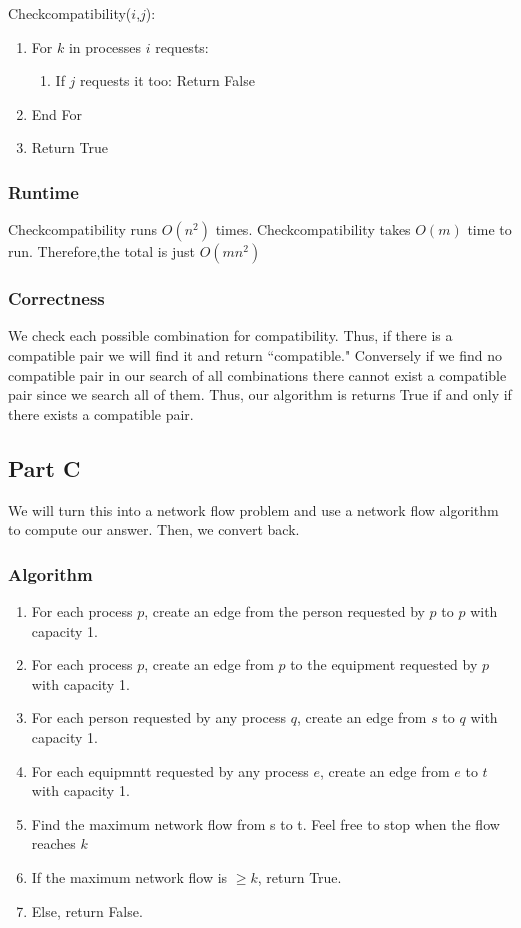 \documentclass{article}
\begin{document}
\begin{center}Checkcompatibility($i$,$j$):\end{center}
\begin{enumerate}
\item For $k$ in processes $i$ requests:
\begin{enumerate}
\item If $j$ requests it too: Return False
\end{enumerate}
\item End For
\item Return True
\end{enumerate}

\subsubsection{Runtime}
Checkcompatibility runs $O(n^2)$ times. Checkcompatibility takes $O(m)$ time to run. Therefore,the total is just $O(mn^2) $
\subsubsection{Correctness}
We check each possible combination for compatibility. Thus, if there is a compatible pair we will find it and return ``compatible." Conversely if we find no compatible pair in our search of all combinations there cannot exist a compatible pair since we search all of them. Thus, our algorithm is returns True if and only if there exists a compatible pair.

\subsection{Part C}
We will turn this into a network flow problem and use a network flow algorithm to compute our answer. Then, we convert back.
\subsubsection{Algorithm}
\begin{enumerate}
\item For each process $p$, create an edge from the person requested by $p$ to $p$ with capacity 1. 
\item For each process $p$, create an edge from $p$ to the equipment requested by $p$ with capacity 1.
\item For each person requested by any process $q$, create an edge from $s$ to $q$ with capacity 1. 
\item For each equipmntt requested by any process $e$, create an edge from $e$ to $t$ with capacity 1. 
\item Find the maximum network flow from s to t. Feel free to stop when the flow reaches $k$ 
\item If the maximum network flow is $\geq k$, return True. 
\item Else, return False. 
\end{enumerate}
\end{document}
